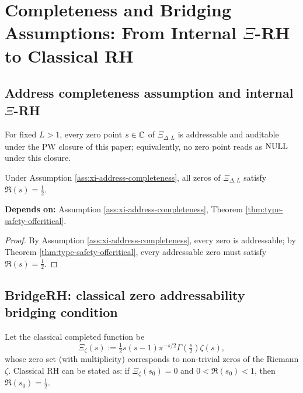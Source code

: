 \section{Completeness and Bridging Assumptions: From Internal $\Xi$-RH to Classical RH}\label{sec:bridge-rh}

\subsection{Address completeness assumption and internal $\Xi$-RH}
\begin{assumption}\label{ass:xi-address-completeness}
For fixed $L>1$, every zero point $s\in\mathbb{C}$ of $\Xi_{\Delta,L}$ is addressable and auditable under the PW closure of this paper; equivalently, no zero point reads as $\mathrm{NULL}$ under this closure.\par
\end{assumption}

\begin{corollary}\label{cor:xi-rh}
Under Assumption \ref{ass:xi-address-completeness}, all zeros of $\Xi_{\Delta,L}$ satisfy $\Re(s)=\tfrac12$.\par
\noindent\textnormal{\textbf{Depends on:} Assumption \ref{ass:xi-address-completeness}, Theorem \ref{thm:type-safety-offcritical}.}\par
\end{corollary}

\begin{proof}
By Assumption \ref{ass:xi-address-completeness}, every zero is addressable; by Theorem \ref{thm:type-safety-offcritical}, every addressable zero must satisfy $\Re(s)=\tfrac12$.\par
\end{proof}

\subsection{BridgeRH: classical zero addressability bridging condition}
Let the classical completed function be
$$
\Xi_\zeta(s):=\tfrac12 s(s-1)\pi^{-s/2}\Gamma\!\left(\tfrac{s}{2}\right)\zeta(s),
$$
whose zero set (with multiplicity) corresponds to non-trivial zeros of the Riemann $\zeta$. Classical RH can be stated as: if $\Xi_\zeta(s_0)=0$ and $0<\Re(s_0)<1$, then $\Re(s_0)=\tfrac12$.\par


